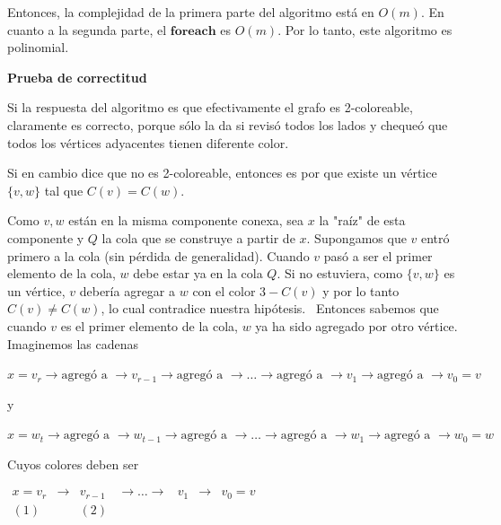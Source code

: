 \documentclass[10pt,a4paper]{article}
\begin{document}
Entonces, la complejidad de la primera parte del algoritmo está en $O(m)$. En cuanto a la segunda parte, el $\textbf{foreach}$ es $O(m)$. Por lo tanto, este algoritmo es polinomial.

\textbf{Prueba de correctitud}

Si la respuesta del algoritmo es que efectivamente el grafo es 2-coloreable, claramente es correcto, porque sólo la da si revisó todos los lados y chequeó que todos los vértices adyacentes tienen diferente color.

Si en cambio dice que no es 2-coloreable, entonces es por que existe un vértice $\{v, w\}$ tal que $C(v) = C(w)$.

Como $v, w$ están en la misma componente conexa, sea $x$ la "raíz" de esta componente y $Q$ la cola que se construye a partir de $x$. Supongamos que $v$ entró primero a la cola (sin pérdida de generalidad). Cuando $v$ pasó a ser el primer elemento de la cola, $w$ debe estar ya en la cola $Q$. Si no estuviera, como $\{v, w\}$ es un vértice, $v$ debería agregar a $w$ con el color $3 - C(v)$ y por lo tanto $C(v) \neq C(w)$, lo cual contradice nuestra hipótesis.  Entonces sabemos que cuando $v$ es el primer elemento de la cola, $w$ ya ha sido agregado por otro vértice. Imaginemos las cadenas

\begin{center}
$x = v_r \rightarrow\text{agregó a } \rightarrow v_{r-1} \rightarrow\text{agregó a } \rightarrow \dots \rightarrow\text{agregó a } \rightarrow v_1 \rightarrow\text{agregó a } \rightarrow v_0 = v$
\end{center}

\begin{center}
y
\end{center}

\begin{center}
$x = w_t \rightarrow\text{agregó a } \rightarrow w_{t-1} \rightarrow\text{agregó a } \rightarrow \dots \rightarrow\text{agregó a } \rightarrow w_1 \rightarrow\text{agregó a } \rightarrow w_0 = w$
\end{center}

Cuyos colores deben ser

\begin{center}
$\begin{array}{ccccccc} x = v_r &\rightarrow &v_{r-1} &\rightarrow \dots \rightarrow &v_1 &\rightarrow &v_0 = v\\ (1) & &(2) & & & &\\ \end{array}$
\end{center}
\end{document}
